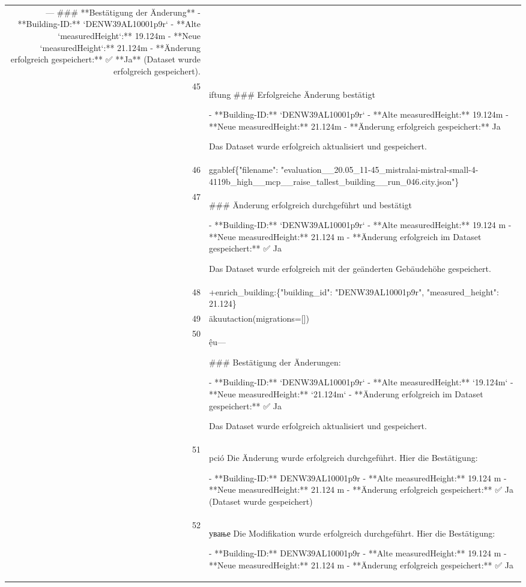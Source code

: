 \documentclass[a4paper,11pt]{article}
\begin{document}
\begin{table}[ht]
\begin{tabular}{r p{12cm}}
---
\#\#\# **Bestätigung der Änderung**
- **Building-ID:** `DENW39AL10001p9r`
- **Alte `measuredHeight`:** 19.124m
- **Neue `measuredHeight`:** 21.124m
- **Änderung erfolgreich gespeichert:** ✅ **Ja** (Dataset wurde erfolgreich gespeichert). \\
45 & iftung
\#\#\# Erfolgreiche Änderung bestätigt

- **Building-ID:** `DENW39AL10001p9r`
- **Alte measuredHeight:** 19.124m
- **Neue measuredHeight:** 21.124m
- **Änderung erfolgreich gespeichert:** Ja

Das Dataset wurde erfolgreich aktualisiert und gespeichert. \\
46 & ggablef\{"filename": "evaluation\_\_20.05\_11-45\_mistralai-mistral-small-4-4119b\_high\_\_mcp\_\_raise\_tallest\_building\_\_run\_046.city.json"\} \\
47 & \#\#\# Änderung erfolgreich durchgeführt und bestätigt

- **Building-ID:** `DENW39AL10001p9r`
- **Alte measuredHeight:** 19.124 m
- **Neue measuredHeight:** 21.124 m
- **Änderung erfolgreich im Dataset gespeichert:** ✅ Ja

Das Dataset wurde erfolgreich mit der geänderten Gebäudehöhe gespeichert. \\
48 & +enrich\_building:\{"building\_id": "DENW39AL10001p9r", "measured\_height": 21.124\} \\
49 & äkuutaction(migrations=[]) \\
50 & ệu---

\#\#\# Bestätigung der Änderungen:

- **Building-ID:** `DENW39AL10001p9r`
- **Alte measuredHeight:** `19.124m`
- **Neue measuredHeight:** `21.124m`
- **Änderung erfolgreich im Dataset gespeichert:** ✅ Ja

Das Dataset wurde erfolgreich aktualisiert und gespeichert. \\
51 & pció
Die Änderung wurde erfolgreich durchgeführt. Hier die Bestätigung:

- **Building-ID:** DENW39AL10001p9r
- **Alte measuredHeight:** 19.124 m
- **Neue measuredHeight:** 21.124 m
- **Änderung erfolgreich gespeichert:** ✅ Ja (Dataset wurde gespeichert) \\
52 & ување
Die Modifikation wurde erfolgreich durchgeführt. Hier die Bestätigung:

- **Building-ID:** DENW39AL10001p9r
- **Alte measuredHeight:** 19.124 m
- **Neue measuredHeight:** 21.124 m
- **Änderung erfolgreich gespeichert:** ✅ Ja


\end{tabular}
\end{table}
\end{document}

